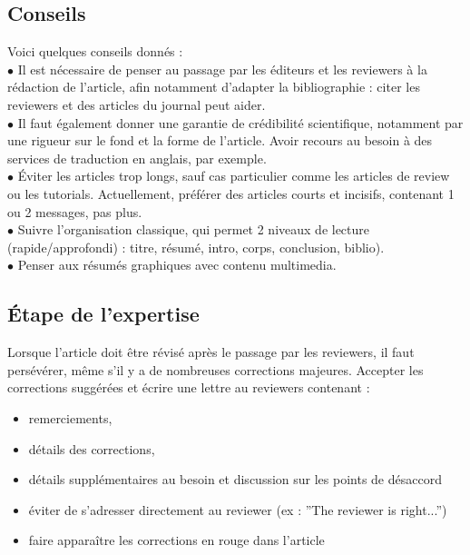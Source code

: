\documentclass[12pt]{article}
\begin{document}
\subsection{Conseils}
Voici quelques conseils donnés : \\
$\bullet$ Il est nécessaire de penser au passage par les éditeurs et les reviewers à la rédaction de l'article, afin notamment d'adapter la bibliographie : citer les reviewers et des articles du journal peut aider.\\
$\bullet$ Il faut également donner une garantie de crédibilité scientifique, notamment par une rigueur sur le fond et la forme de l'article. Avoir recours au besoin à des services de traduction en anglais, par exemple.\\
$\bullet$ Éviter les articles trop longs, sauf cas particulier comme les articles de review ou les tutorials. Actuellement, préférer des articles courts et incisifs, contenant 1 ou 2 messages, pas plus.\\
$\bullet$ Suivre l'organisation classique, qui permet 2 niveaux de lecture (rapide/approfondi) : titre, résumé, intro, corps, conclusion, biblio).\\
$\bullet$ Penser aux résumés graphiques avec contenu multimedia.

\subsection{Étape de l'expertise}
Lorsque l'article doit être révisé après le passage par les reviewers, il faut persévérer, même s'il y a de nombreuses corrections majeures. Accepter les corrections suggérées et écrire une lettre au reviewers contenant : 
\begin{itemize}
    \item remerciements,
    \item détails des corrections,
    \item détails supplémentaires au besoin et discussion sur les points de désaccord
    \item éviter de s'adresser directement au reviewer (ex : ''The reviewer is right...'')
    \item faire apparaître les corrections en rouge dans l'article
\end{itemize}






%

\end{document}
